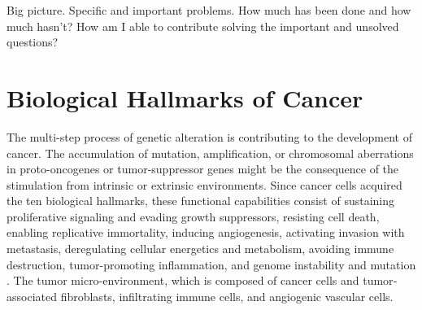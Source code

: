 \documentclass[12pt, a4paper]{article}
\begin{document}
\begin{outline}
\1 Big picture.
\1 Specific and important problems.
\2 How much has been done and how much hasn’t?
\2 How am I able to contribute solving the important and unsolved questions?
\end{outline}




\label{chap:intro}



\section*{Biological Hallmarks of Cancer}

The multi-step process of genetic alteration is contributing to the development of cancer. The accumulation of mutation, amplification, or chromosomal aberrations in proto-oncogenes or tumor-suppressor genes might be the consequence of the stimulation from intrinsic or extrinsic environments.
Since cancer cells acquired the ten biological hallmarks, these functional capabilities consist of sustaining proliferative signaling and evading growth suppressors, resisting cell death, enabling replicative immortality, inducing angiogenesis, activating invasion with metastasis, deregulating cellular energetics and metabolism, avoiding immune destruction, tumor-promoting inflammation, and genome instability and mutation \citep{Hanahan2000, Hanahan2011, Hanahan2017}. The tumor micro-environment, which is composed of cancer cells and tumor‐associated fibroblasts, infiltrating immune cells, and angiogenic vascular cells.
\end{document}
